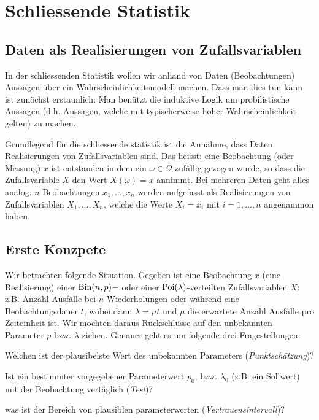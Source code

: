 \chapter{Schliessende Statistik}
\section{Daten als Realisierungen von Zufallsvariablen}
\label{sec8.1}
In der schliessenden Statistik wollen wir anhand von Daten (Beobachtungen) Aussagen über ein Wahrscheinlichkeitsmodell machen. Dass man dies tun kann ist zunächst erstaunlich: Man benützt die induktive Logik um probilistische Aussagen (d.h. Aussagen, welche mit typischerweise hoher Wahrscheinlichkeit gelten)  zu machen.

Grundlegend für die schliessende statistik ist die Annahme, dass Daten Realisierungen von Zufallsvariablen sind. Das heisst: eine Beobachtung (oder \glqq Messung\grqq) $x$ ist entstanden in dem ein $\omega\in\Omega$ zufällig gezogen wurde, so dass die Zufallsvariable $X$ den Wert $X(\omega)=x$ annimmt. Bei mehreren Daten geht alles analog: $n$ Beobachtungen $x_1,\ldots,x_n$ werden aufgefasst als Realisierungen von Zufallsvariablen $X_1,\ldots,X_n$, welche die Werte $X_i=x_i$ mit $i=1,\ldots,n$  angenammon haben.
\section{Erste Konzpete}
Wir betrachten folgende Situation. Gegeben ist eine Beobachtung $x$ (eine Realisierung) einer $\operatorname{Bin}(n,p)-$ oder einer  $\operatorname{Poi}(\lambda)$-verteilten Zufallsvariablen $X$: z.B. Anzahl Ausfälle bei $n$ Wiederholungen oder während eine Beobachtungsdauer $t$, wobei dann $\lambda=\mu t$ und $\mu$ die erwartete Anzahl Ausfälle pro Zeiteinheit ist. Wir möchten daraus Rückschlüsse auf den unbekannten Parameter $p$ bzw. $\lambda$ ziehen. Genauer geht es um folgende drei Fragestellungen:
\begin{compactenum}[1.]
	\item Welchen ist der plausibelste Wert des unbekannten Parameters (\emph{Punktschätzung})?
	\item Ist ein bestimmter vorgegebener Parameterwert $p_0$, bzw. $\lambda_0$ (z.B. ein Sollwert) mit der Beobachtung vertäglich (\emph{Test})?
	\item was ist der Bereich von plausiblen parameterwerten (\emph{Vertrauensintervall})?
\end{compactenum}
